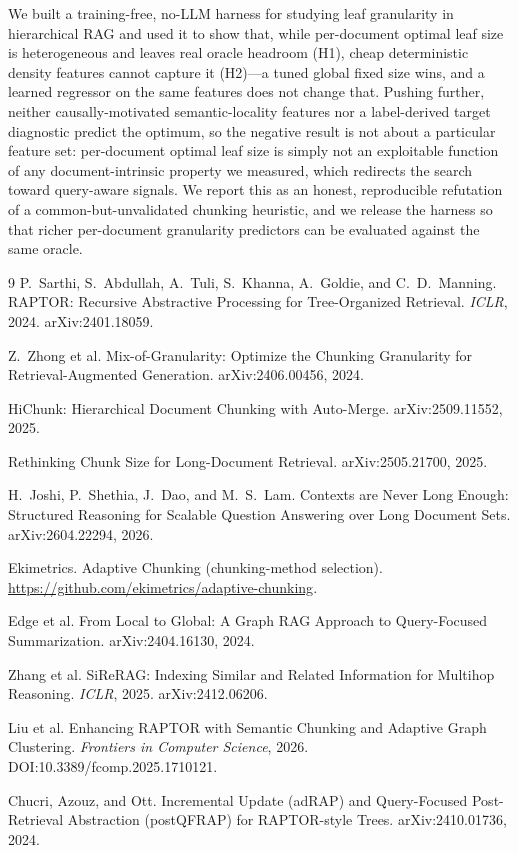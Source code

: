 \documentclass[11pt]{article}
\begin{document}
We built a training-free, no-LLM harness for studying leaf granularity in
hierarchical RAG and used it to show that, while per-document optimal leaf size is
heterogeneous and leaves real oracle headroom (H1), cheap deterministic density
features cannot capture it (H2)---a tuned global fixed size wins, and a learned
regressor on the same features does not change that. Pushing further, neither
causally-motivated semantic-locality features nor a label-derived target
diagnostic predict the optimum, so the negative result is not about a particular
feature set: per-document optimal leaf size is simply not an exploitable function
of any document-intrinsic property we measured, which redirects the search toward
query-aware signals. We report this as an honest, reproducible refutation of a
common-but-unvalidated chunking heuristic, and we release the harness so that
richer per-document granularity predictors can be evaluated against the same
oracle.

\begin{thebibliography}{9}
P.~Sarthi, S.~Abdullah, A.~Tuli, S.~Khanna, A.~Goldie, and C.~D.~Manning.
\newblock RAPTOR: Recursive Abstractive Processing for Tree-Organized Retrieval.
\newblock \emph{ICLR}, 2024. arXiv:2401.18059.

Z.~Zhong et al.
\newblock Mix-of-Granularity: Optimize the Chunking Granularity for
Retrieval-Augmented Generation.
\newblock arXiv:2406.00456, 2024.

HiChunk: Hierarchical Document Chunking with Auto-Merge.
\newblock arXiv:2509.11552, 2025.

Rethinking Chunk Size for Long-Document Retrieval.
\newblock arXiv:2505.21700, 2025.

H.~Joshi, P.~Shethia, J.~Dao, and M.~S.~Lam.
\newblock Contexts are Never Long Enough: Structured Reasoning for Scalable
Question Answering over Long Document Sets.
\newblock arXiv:2604.22294, 2026.

Ekimetrics.
\newblock Adaptive Chunking (chunking-method selection).
\newblock \url{https://github.com/ekimetrics/adaptive-chunking}.

Edge et al.
\newblock From Local to Global: A Graph RAG Approach to Query-Focused Summarization.
\newblock arXiv:2404.16130, 2024.

Zhang et al.
\newblock SiReRAG: Indexing Similar and Related Information for Multihop Reasoning.
\newblock \emph{ICLR}, 2025. arXiv:2412.06206.

Liu et al.
\newblock Enhancing RAPTOR with Semantic Chunking and Adaptive Graph Clustering.
\newblock \emph{Frontiers in Computer Science}, 2026. DOI:10.3389/fcomp.2025.1710121.

Chucri, Azouz, and Ott.
\newblock Incremental Update (adRAP) and Query-Focused Post-Retrieval Abstraction (postQFRAP)
for RAPTOR-style Trees.
\newblock arXiv:2410.01736, 2024. %
\end{thebibliography}
\end{document}

